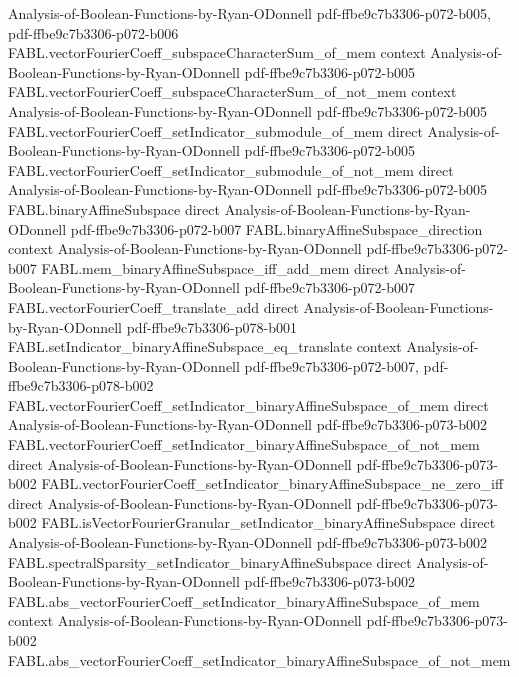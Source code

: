 \begin{theorem}
  {Analysis-of-Boolean-Functions-by-Ryan-ODonnell}
  {pdf-ffbe9c7b3306-p072-b005,
    pdf-ffbe9c7b3306-p072-b006}
\proofstep
  {FABL.vectorFourierCoeff_subspaceCharacterSum_of_mem}
  {context}
  {Analysis-of-Boolean-Functions-by-Ryan-ODonnell}
  {pdf-ffbe9c7b3306-p072-b005}
\proofstep
  {FABL.vectorFourierCoeff_subspaceCharacterSum_of_not_mem}
  {context}
  {Analysis-of-Boolean-Functions-by-Ryan-ODonnell}
  {pdf-ffbe9c7b3306-p072-b005}
\proofstep
  {FABL.vectorFourierCoeff_setIndicator_submodule_of_mem}
  {direct}
  {Analysis-of-Boolean-Functions-by-Ryan-ODonnell}
  {pdf-ffbe9c7b3306-p072-b005}
\proofstep
  {FABL.vectorFourierCoeff_setIndicator_submodule_of_not_mem}
  {direct}
  {Analysis-of-Boolean-Functions-by-Ryan-ODonnell}
  {pdf-ffbe9c7b3306-p072-b005}
\proofstep
  {FABL.binaryAffineSubspace}
  {direct}
  {Analysis-of-Boolean-Functions-by-Ryan-ODonnell}
  {pdf-ffbe9c7b3306-p072-b007}
\proofstep
  {FABL.binaryAffineSubspace_direction}
  {context}
  {Analysis-of-Boolean-Functions-by-Ryan-ODonnell}
  {pdf-ffbe9c7b3306-p072-b007}
\proofstep
  {FABL.mem_binaryAffineSubspace_iff_add_mem}
  {direct}
  {Analysis-of-Boolean-Functions-by-Ryan-ODonnell}
  {pdf-ffbe9c7b3306-p072-b007}
\proofstep
  {FABL.vectorFourierCoeff_translate_add}
  {direct}
  {Analysis-of-Boolean-Functions-by-Ryan-ODonnell}
  {pdf-ffbe9c7b3306-p078-b001}
\proofstep
  {FABL.setIndicator_binaryAffineSubspace_eq_translate}
  {context}
  {Analysis-of-Boolean-Functions-by-Ryan-ODonnell}
  {pdf-ffbe9c7b3306-p072-b007,
    pdf-ffbe9c7b3306-p078-b002}
\proofstep
  {FABL.vectorFourierCoeff_setIndicator_binaryAffineSubspace_of_mem}
  {direct}
  {Analysis-of-Boolean-Functions-by-Ryan-ODonnell}
  {pdf-ffbe9c7b3306-p073-b002}
\proofstep
  {FABL.vectorFourierCoeff_setIndicator_binaryAffineSubspace_of_not_mem}
  {direct}
  {Analysis-of-Boolean-Functions-by-Ryan-ODonnell}
  {pdf-ffbe9c7b3306-p073-b002}
\proofstep
  {FABL.vectorFourierCoeff_setIndicator_binaryAffineSubspace_ne_zero_iff}
  {direct}
  {Analysis-of-Boolean-Functions-by-Ryan-ODonnell}
  {pdf-ffbe9c7b3306-p073-b002}
\proofstep
  {FABL.isVectorFourierGranular_setIndicator_binaryAffineSubspace}
  {direct}
  {Analysis-of-Boolean-Functions-by-Ryan-ODonnell}
  {pdf-ffbe9c7b3306-p073-b002}
\proofstep
  {FABL.spectralSparsity_setIndicator_binaryAffineSubspace}
  {direct}
  {Analysis-of-Boolean-Functions-by-Ryan-ODonnell}
  {pdf-ffbe9c7b3306-p073-b002}
\proofstep
  {FABL.abs_vectorFourierCoeff_setIndicator_binaryAffineSubspace_of_mem}
  {context}
  {Analysis-of-Boolean-Functions-by-Ryan-ODonnell}
  {pdf-ffbe9c7b3306-p073-b002}
\proofstep
  {FABL.abs_vectorFourierCoeff_setIndicator_binaryAffineSubspace_of_not_mem}

\end{theorem}
